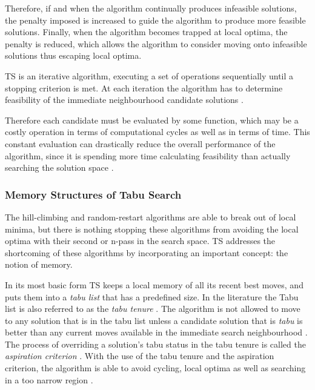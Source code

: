 Therefore, if and when the algorithm continually produces infeasible solutions, the penalty imposed is increased to guide the algorithm to produce more feasible solutions. Finally, when the algorithm becomes trapped at local optima, the penalty is reduced, which allows the algorithm to consider moving onto infeasible solutions thus escaping local optima.

TS is an iterative algorithm, executing a set of operations sequentially until a stopping criterion is met\cite{EvoParallelTabu,TabuVechicleRoutingWithTimeWindows}. At each iteration the algorithm has to determine feasibility of the immediate neighbourhood candidate solutions \cite{EvoParallelTabu,TabuVechicleRoutingWithTimeWindows}. 

Therefore each candidate must be evaluated by some function, which may be a costly operation in terms of computational cycles as well as in terms of time\cite{EvoParallelTabu,TabuVechicleRoutingWithTimeWindows}. This constant evaluation can drastically reduce the overall performance of the algorithm, since it is spending more time calculating feasibility than actually searching the solution space \cite{EvoParallelTabu,TabuVechicleRoutingWithTimeWindows}. 

\subsubsection{Memory Structures of Tabu Search}
The hill-climbing and random-restart algorithms are able to break out of local minima, but there is nothing stopping these algorithms from avoiding the local optima with their second or n-pass in the search space. \gls{TS} addresses the shortcoming of these algorithms by incorporating an important concept: the notion of memory.

In its most basic form \gls{TS} keeps a local memory of all its recent best moves, and puts them into a \emph{tabu list} that has a predefined size. In the literature the Tabu list is also referred to as the \emph{tabu tenure} \cite{TSHazardous,TabuCarryOver}. The algorithm is not allowed to move to any solution that is in the tabu list unless a candidate solution that is \emph{tabu} is better than any current moves available in the immediate search neighbourhood \cite{TabuCarryOver,ReactiveTabuVHR}. The process of overriding a solution's tabu status in the tabu tenure is called the \emph{aspiration criterion} \cite{TSHazardous,TabuCarryOver}. With the use of the tabu tenure and the aspiration criterion, the algorithm is able to avoid cycling, local optima as well as searching in a too narrow region \cite{TabuSingleMachineScheduling,CircuitTabu}.

